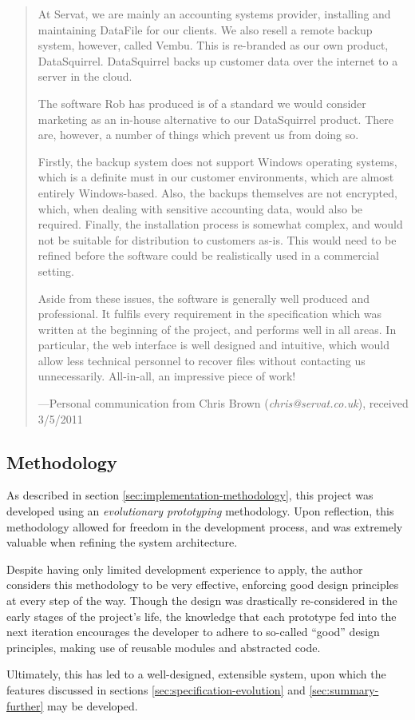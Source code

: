 \begin{quote}
\begin{em}

    At Servat, we are mainly an accounting systems provider, installing and
    maintaining DataFile for our clients. We also resell a remote backup
    system, however, called Vembu. This is re-branded as our own product,
    DataSquirrel. DataSquirrel backs up customer data over the internet to
    a server in the cloud.

    The software Rob has produced is of a standard we would consider marketing
    as an in-house alternative to our DataSquirrel product. There are, however,
    a number of things which prevent us from doing so.
    
    Firstly, the backup system does not support Windows operating systems,
    which is a definite must in our customer environments, which are almost
    entirely Windows-based. Also, the backups themselves are not encrypted,
    which, when dealing with sensitive accounting data, would also be required.
    Finally, the installation process is somewhat complex, and would not be
    suitable for distribution to customers as-is. This would need to be refined
    before the software could be realistically used in a commercial setting.

    Aside from these issues, the software is generally well produced and
    professional. It fulfils every requirement in the specification which was
    written at the beginning of the project, and performs well in all areas. In
    particular, the web interface is well designed and intuitive, which would
    allow less technical personnel to recover files without contacting us
    unnecessarily. All-in-all, an impressive piece of work!
\end{em}

    ---Personal communication from Chris Brown (\emph{chris@servat.co.uk}),
    received 3/5/2011
\end{quote}

\subsection{Methodology}

As described in section \ref{sec:implementation-methodology}, this project was
developed using an \emph{evolutionary prototyping} methodology. Upon
reflection, this methodology allowed for freedom in the development process,
and was extremely valuable when refining the system architecture.

Despite having only limited development experience to apply, the author
considers this methodology to be very effective, enforcing good design
principles at every step of the way. Though the design was drastically
re-considered in the early stages of the project's life, the knowledge that
each prototype fed into the next iteration encourages the developer to adhere
to so-called ``good'' design principles, making use of reusable modules and
abstracted code.

Ultimately, this has led to a well-designed, extensible system, upon which the
features discussed in sections \ref{sec:specification-evolution} and
\ref{sec:summary-further} may be developed.
